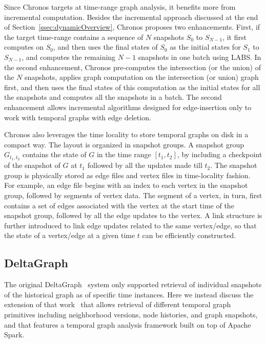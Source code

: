\documentclass{svjour3}
\begin{document}
\vspace{2mm}

 Since Chronos targets at time-range graph analysis, it benefits more from incremental computation. Besides the incremental approach discussed at the end of Section~\ref{ssec:dynamicOverview}, Chronos proposes two enhancements. First, if the target time-range contains a sequence of $N$ snapshots $S_0$ to $S_{N-1}$, it first computes on $S_0$, and then uses the final states of $S_0$ as the initial states for $S_1$ to $S_{N-1}$, and computes the remaining $N-1$ snapshots in one batch using LABS. In the second enhancement, Chronos pre-computes the intersection (or the union) of the $N$ snapshots, applies graph computation on the intersection (or union) graph first, and then uses the final states of this computation as the initial states for all the snapshots and computes all the snapshots in a batch. The second enhancement allows incremental algorithms designed for edge-insertion only to work with temporal graphs with edge deletion.

\vspace{2mm}

 Chronos also leverages the time locality to store temporal graphs on disk in a compact way. The layout is organized in snapshot groups. A snapshot group $G_{t_1,t_2}$ contains the state of $G$ in the time range $[t_1,t_2]$, by including a checkpoint of the snapshot of $G$ at $t_1$ followed by all the updates made till $t_2$. The snapshot group is physically stored as edge files and vertex files in time-locality fashion. For example, an edge file begins with an index to each vertex in the snapshot group, followed by segments of vertex data. The segment of a vertex, in turn, first contains a set of edges associated with the vertex at the start time of the snapshot group, followed by all the edge updates to the vertex. A link structure is further introduced to link edge updates related to the same vertex/edge, so that the state of a vertex/edge at a given time $t$ can be efficiently constructed.

\subsection{DeltaGraph}
The original DeltaGraph~\cite{KhuranaD13:HistoricGraph} system only supported retrieval of individual snapshots of the historical graph as of specific time instances. Here we instead discuss the extension of that work~\cite{KhuranaD16:HistoricGraph} that allows retrieval of different temporal graph primitives including neighborhood versions, node histories, and graph snapshots, and that features a temporal graph analysis framework built on top of Apache Spark. 
\end{document}
